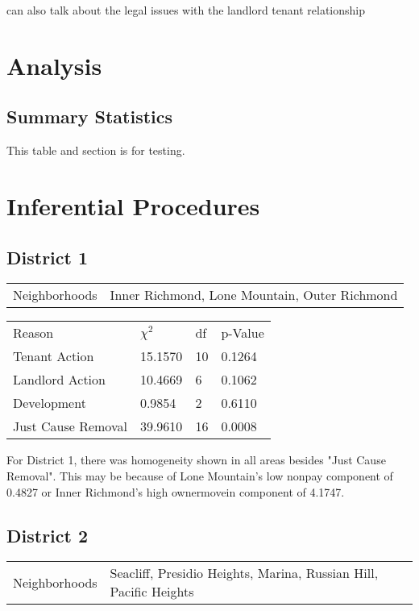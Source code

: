 \documentclass[]{article}
\begin{document}
can also talk about the legal issues with the landlord tenant relationship
\section{Analysis}
\subsection{Summary Statistics}
This table and section is for testing.

\section{Inferential Procedures}
\subsection{District 1}

\begin{table}[!h]
\centering
\begin{tabular}{l | l}
Neighborhoods & Inner Richmond, Lone Mountain, Outer Richmond \\
\end{tabular}
\end{table}
\FloatBarrier

\begin {table}[!h]
\centering
\begin{tabular}{l | l | l | l}
	
	Reason	&  $\chi ^{2}$ & df & p-Value \\
	Tenant Action 		   &  15.1570  & 10  & 0.1264  \\
	Landlord Action	       &  10.4669  & 6   & 0.1062 \\
	Development			   &  0.9854   & 2   & 0.6110 \\
	Just Cause Removal	   &  39.9610  & 16  & 0.0008 \\
\end{tabular} \newline
\end{table}
\FloatBarrier


For District 1, there was homogeneity shown in all areas besides "Just Cause Removal". This may be because of Lone Mountain's low nonpay component of 0.4827 or Inner Richmond's high ownermovein component of 4.1747.


\subsection{District 2}
\begin{table}[!h]
	\centering
	\begin{tabular}{l | l}
		Neighborhoods & Seacliff, Presidio Heights, Marina, Russian Hill, Pacific Heights \\
	\end{tabular}
\end{table}
\FloatBarrier
\end{document}
